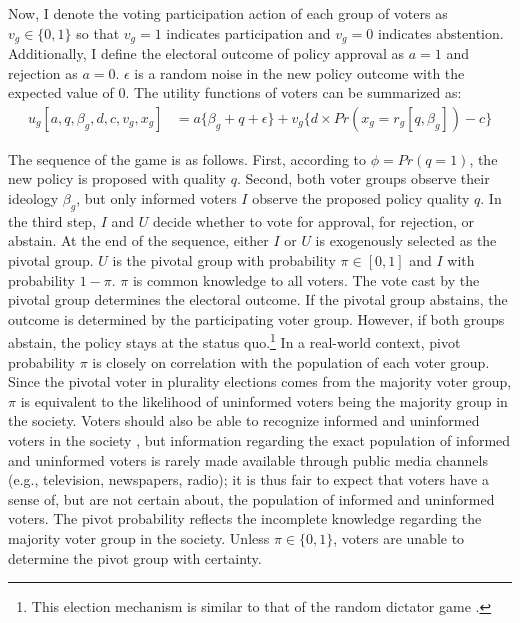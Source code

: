 \documentclass[letterpaper, 12pt]{article}
\begin{document}
    \par Now, I denote the voting participation action of each group of voters as $v_g \in \{0,1\}$ so that $v_g=1$ indicates participation and $v_g=0$ indicates abstention. Additionally, I define the electoral outcome of policy approval as $a=1$ and rejection as $a=0$. $\epsilon$ is a random noise in the new policy outcome with the expected value of 0. The utility functions of voters can be summarized as:
    \begin{align}
    u_g [a,q,\beta_g,d,c,v_g,x_g] &= a\{\beta_g + q + \epsilon\} + v_g \{d \times Pr(x_g=r_g[q, \beta_g]) - c \} \label{uf}
    \end{align}
    
    \par The sequence of the game is as follows. First, according to $\phi = Pr(q=1)$, the new policy is proposed with quality $q$. Second, both voter groups observe their ideology $\beta_g$, but only informed voters $I$ observe the proposed policy quality $q$. In the third step, $I$ and $U$ decide whether to vote for approval, for rejection, or abstain. At the end of the sequence, either $I$ or $U$ is exogenously selected as the pivotal group. $U$ is the pivotal group with probability $\pi \in [0, 1]$ and $I$ with probability $1-\pi$. $\pi$ is common knowledge to all voters. The vote cast by the pivotal group determines the electoral outcome. If the pivotal group abstains, the outcome is determined by the participating voter group. However, if both groups abstain, the policy stays at the status quo.\footnote{This election mechanism is similar to that of the random dictator game \citep{Morton2015whmo}.} In a real-world context, pivot probability $\pi$ is closely on correlation with the population of each voter group. Since the pivotal voter in plurality elections comes from the majority voter group, $\pi$ is equivalent to the likelihood of uninformed voters being the majority group in the society. Voters should also be able to recognize informed and uninformed voters in the society \citep{Huckfeldt2001thso}, but information regarding the exact population of informed and uninformed voters is rarely made available through public media channels (e.g., television, newspapers, radio); it is thus fair to expect that voters have a sense of, but are not certain about, the population of informed and uninformed voters. The pivot probability reflects the incomplete knowledge regarding the majority voter group in the society. Unless $\pi \in \{0, 1\}$, voters are unable to determine the pivot group with certainty.
    
\end{document}
